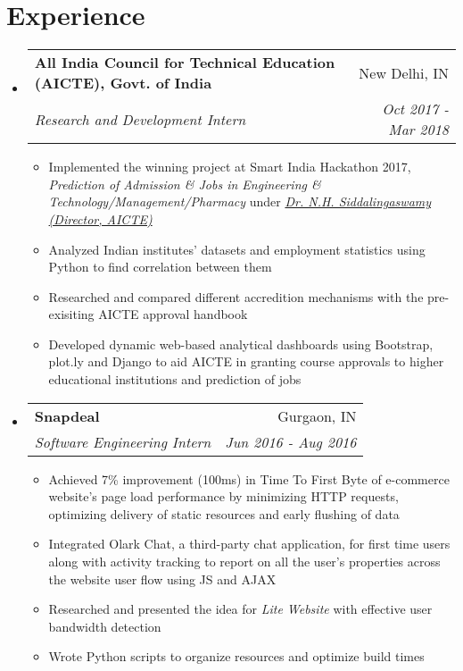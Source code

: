 \documentclass[letterpaper,11pt]{article}
\makeatletter
\newcommand{\resumeItemi}[2]{
  \item\small{
    \textbf{#1}{#2 \vspace{-2pt}}
  }
}
\newcommand{\resumeSubheading}[4]{
  \vspace{-1pt}\item
    \begin{tabular*}{0.9835\textwidth}{l@{\extracolsep{\fill}}r}
      \textbf{#1} & #2 \\
      \textit{\small#3} & \textit{\small #4} \\
    \end{tabular*}\vspace{-5pt}
}
\newcommand{\resumeSubHeadingListStart}{\begin{itemize}[leftmargin=*]}
\newcommand{\resumeSubHeadingListEnd}{\end{itemize}}
\newcommand{\resumeItemListStart}{\begin{itemize}}
\newcommand{\resumeItemListEnd}{\end{itemize}\vspace{-5pt}}
\makeatother
\begin{document}
\section{Experience}
  \resumeSubHeadingListStart
    \itemsep0.35em
    \resumeSubheading
      {All India Council for Technical Education (AICTE), Govt. of India}{New Delhi, IN} 
      {Research and Development Intern}{Oct 2017 - Mar 2018}
      \resumeItemListStart
        \resumeItemi{}
          {Implemented the winning project at Smart India Hackathon 2017, {\it Prediction of Admission \& Jobs in Engineering \& Technology/Management/Pharmacy} under \href{https://www.aicte-india.org/leadership/dr-nh-siddalingaswamy}{\it Dr. N.H. Siddalingaswamy (Director, AICTE)}}
        \resumeItemi{}
          {Analyzed Indian institutes' datasets and employment statistics using Python to find correlation between them}
        \resumeItemi{}
          {Researched and compared different accredition mechanisms with the pre-exisiting AICTE approval handbook}
        \resumeItemi{}
          {Developed dynamic web-based analytical dashboards using Bootstrap, plot.ly and Django to aid AICTE in granting course approvals to higher educational institutions and prediction of jobs}
      \resumeItemListEnd

    \resumeSubheading
      {Snapdeal}{Gurgaon, IN}
      {Software Engineering Intern}{Jun 2016 - Aug 2016}
      \resumeItemListStart
        \resumeItemi{}
          {Achieved 7\% improvement (100ms) in Time To First Byte of e-commerce website's page load performance by minimizing HTTP requests, optimizing delivery of static resources and early flushing of data}
        \resumeItemi{}
          {Integrated Olark Chat, a third-party chat application, for first time users along with activity tracking to report on all the user's properties across the website user flow using JS and AJAX}
        \resumeItemi{}
          {Researched and presented the idea for {\it Lite Website} with effective user bandwidth detection}
        \resumeItemi{}
          {Wrote Python scripts to organize resources and optimize build times}
      \resumeItemListEnd

  \resumeSubHeadingListEnd


\end{document}
